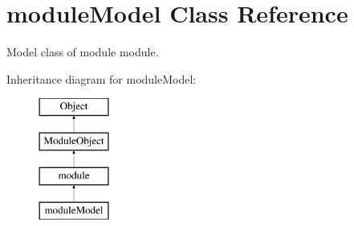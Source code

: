 \hypertarget{classmoduleModel}{}\section{module\+Model Class Reference}
\label{classmoduleModel}


Model class of module module.  


Inheritance diagram for module\+Model\+:\begin{figure}[H]
\begin{center}
\leavevmode
\includegraphics[height=4.000000cm]{classmoduleModel}
\end{center}
\end{figure}
